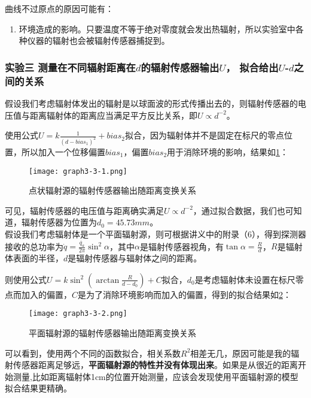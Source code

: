 \documentclass[dvipsnames, svgnames,a4paper,11pt]{article}
\begin{document}
	曲线不过原点的原因可能有：
	\begin{enumerate}
		\item 环境造成的影响。只要温度不等于绝对零度就会发出热辐射，所以实验室中各种仪器的辐射也会被辐射传感器捕捉到。
		

	\end{enumerate}
	





	\subsubsection{实验三 \quad 测量在不同辐射距离在$d$的辐射传感器输出$U$， 拟合给出$U$-$d$之间的关系}

	假设我们考虑辐射体发出的辐射是以球面波的形式传播出去的，则辐射传感器的电压值与距离辐射体的距离应当满足平方反比关系，即$U\propto d^{-2}$。

	使用公式$U=k\frac{1}{(d-bias_1)^{2}}+bias_2$拟合，因为辐射体并不是固定在标尺的零点位置，所以加入一个位移偏置$bias_1$，偏置$bias_2$用于消除环境的影响，结果如\cref{fig:graph3-3-1}：

	\begin{figure}[htbp]
		\centering
		\texttt{[image: graph3-3-1.png]}
		\caption{点状辐射源的辐射传感器输出随距离变换关系}
		\label{fig:graph3-3-1}
	\end{figure}

	可见，辐射传感器的电压值与距离确实满足$U\propto d^{-2}$，通过拟合数据，我们也可知道，辐射传感器为位置为$d_0=45.73mm$。\\


	假设我们考虑辐射体是一个平面辐射源，则可根据讲义中的附录（6），得到探测器接收的总功率为$\dot{q}=\frac{\dot{q_a}}{2\pi}\sin^2\alpha$，其中$\alpha$是辐射传感器视角，有$\tan\alpha=\frac{R}{d}$，$R$是辐射体表面的半径，$d$是辐射传感器与辐射体之间的距离。

	则使用公式$U=k\sin^2(\arctan\frac{R}{d-d_0})+C$拟合，$d_0$是考虑辐射体未设置在标尺零点而加入的偏置，$C$是为了消除环境影响而加入的偏置，得到的拟合结果如\cref{fig:graph3-3-2}：

	\begin{figure}[htbp]
		\centering
		\texttt{[image: graph3-3-2.png]}
		\caption{平面辐射源的辐射传感器输出随距离变换关系}
		\label{fig:graph3-3-2}
	\end{figure}

	可以看到，使用两个不同的函数拟合，相关系数$R^2$相差无几，原因可能是我的辐射传感器距离足够远，\textbf{平面辐射源的特性并没有体现出来}。如果是从很近的距离开始测量,比如距离辐射体1cm的位置开始测量，应该会发现使用平面辐射源的模型拟合结果更精确。
\end{document}
